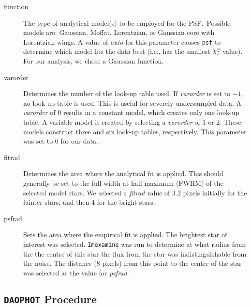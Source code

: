 \begin{description}

\item[function]

The type of analytical model(s) to be employed for the PSF.\@\ Possible %
models are: Gaussian, Moffat, Lorentzian, or Gaussian core with
Lorentzian wings. A value of \textit{auto} for this parameter causes
\texttt{psf} to determine which model fits the data best (i.e., has
the smallest $\Chi^{2}_{r}$ value). For our analysis, we chose a
Gaussian function. %

\item[varorder]

Determines the number of the look-up table used. If
\textit{varorder} is set to $-1$, no look-up table is
used. This is useful for severely undersampled data. A
\textit{varorder} of 0 results in a constant model, which creates
only one look-up table. A variable model is created by
selecting a \textit{varorder} of 1 or 2. These models construct
three and six look-up tables, respectively. This parameter was
set to 0 for our data. %

\item[fitrad]

Determines the area where the analytical fit is applied. This
should generally be set to the full-width at half-maximum (FWHM)
of the selected model stars. We selected a \textit{fitrad} value
of 3.2 pixels initially for the fainter stars, and then 4 for
the bright stars.  %

\item[psfrad]

Sets the area where the empirical fit is applied. The brightest star of
interest was selected. \texttt{Imexamine} was run to determine at
what radius from the the centre of this star the flux from the star
was indistinguishable from the noise. The distance (8 pixels) from
this point to the centre of the star was selected as the value for
\textit{psfrad}. %

\end{description}


\subsection{\texttt{DAOPHOT} Procedure}\label{cha:IRAF:sec:Photometry:subsec:DAOPHOT}

